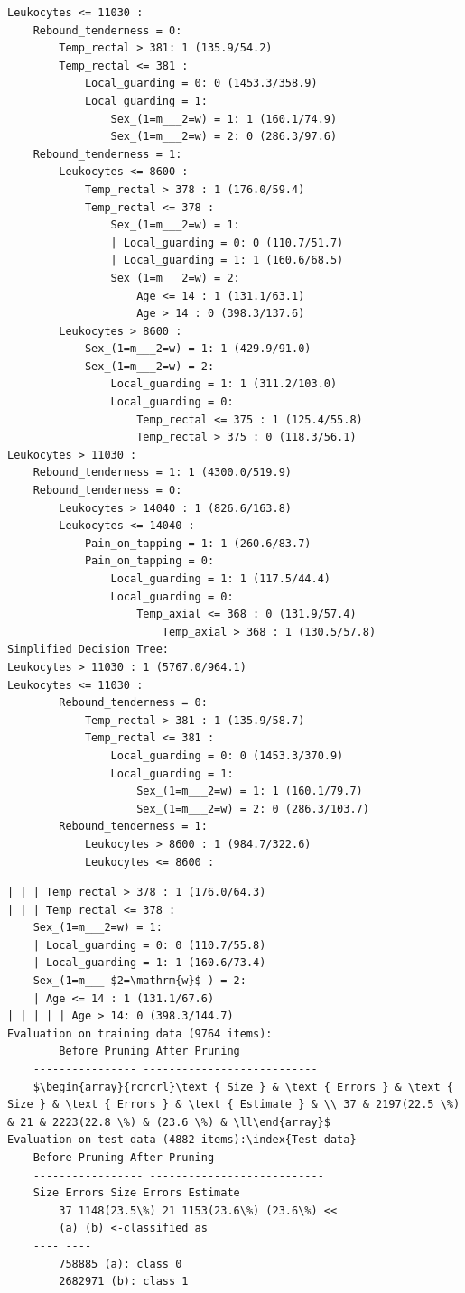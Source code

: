 \documentclass[10pt]{book}
\begin{document}
\begin{verbatim}
Leukocytes <= 11030 :
    Rebound_tenderness = 0:
        Temp_rectal > 381: 1 (135.9/54.2)
        Temp_rectal <= 381 :
            Local_guarding = 0: 0 (1453.3/358.9)
            Local_guarding = 1:
                Sex_(1=m___2=w) = 1: 1 (160.1/74.9)
                Sex_(1=m___2=w) = 2: 0 (286.3/97.6)
    Rebound_tenderness = 1:
        Leukocytes <= 8600 :
            Temp_rectal > 378 : 1 (176.0/59.4)
            Temp_rectal <= 378 :
                Sex_(1=m___2=w) = 1:
                | Local_guarding = 0: 0 (110.7/51.7)
                | Local_guarding = 1: 1 (160.6/68.5)
                Sex_(1=m___2=w) = 2:
                    Age <= 14 : 1 (131.1/63.1)
                    Age > 14 : 0 (398.3/137.6)
        Leukocytes > 8600 :
            Sex_(1=m___2=w) = 1: 1 (429.9/91.0)
            Sex_(1=m___2=w) = 2:
                Local_guarding = 1: 1 (311.2/103.0)
                Local_guarding = 0:
                    Temp_rectal <= 375 : 1 (125.4/55.8)
                    Temp_rectal > 375 : 0 (118.3/56.1)
Leukocytes > 11030 :
    Rebound_tenderness = 1: 1 (4300.0/519.9)
    Rebound_tenderness = 0:
        Leukocytes > 14040 : 1 (826.6/163.8)
        Leukocytes <= 14040 :
            Pain_on_tapping = 1: 1 (260.6/83.7)
            Pain_on_tapping = 0:
                Local_guarding = 1: 1 (117.5/44.4)
                Local_guarding = 0:
                    Temp_axial <= 368 : 0 (131.9/57.4)
                        Temp_axial > 368 : 1 (130.5/57.8)
Simplified Decision Tree:
Leukocytes > 11030 : 1 (5767.0/964.1)
Leukocytes <= 11030 :
        Rebound_tenderness = 0:
            Temp_rectal > 381 : 1 (135.9/58.7)
            Temp_rectal <= 381 :
                Local_guarding = 0: 0 (1453.3/370.9)
                Local_guarding = 1:
                    Sex_(1=m___2=w) = 1: 1 (160.1/79.7)
                    Sex_(1=m___2=w) = 2: 0 (286.3/103.7)
        Rebound_tenderness = 1:
            Leukocytes > 8600 : 1 (984.7/322.6)
            Leukocytes <= 8600 :
\end{verbatim}

\begin{verbatim}
| | | Temp_rectal > 378 : 1 (176.0/64.3)
| | | Temp_rectal <= 378 :
    Sex_(1=m___2=w) = 1:
    | Local_guarding = 0: 0 (110.7/55.8)
    | Local_guarding = 1: 1 (160.6/73.4)
    Sex_(1=m___ $2=\mathrm{w}$ ) = 2:
    | Age <= 14 : 1 (131.1/67.6)
| | | | | Age > 14: 0 (398.3/144.7)
Evaluation on training data (9764 items):
        Before Pruning After Pruning
    ---------------- ---------------------------
    $\begin{array}{rcrcrl}\text { Size } & \text { Errors } & \text { Size } & \text { Errors } & \text { Estimate } & \\ 37 & 2197(22.5 \%) & 21 & 2223(22.8 \%) & (23.6 \%) & \ll\end{array}$
Evaluation on test data (4882 items):\index{Test data}
    Before Pruning After Pruning
    ----------------- ---------------------------
    Size Errors Size Errors Estimate
        37 1148(23.5\%) 21 1153(23.6\%) (23.6\%) <<
        (a) (b) <-classified as
    ---- ----
        758885 (a): class 0
        2682971 (b): class 1
\end{verbatim}
\end{document}
